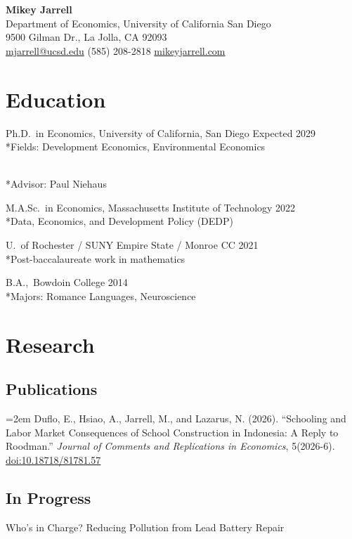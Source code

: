 \documentclass[12pt]{article}
\newcommand{\indentedline}[1]{%
    \\*\setlength{\parindent}{2em}\indent#1\setlength{\parindent}{0pt}%
    \vspace{0.5\baselineskip}%
}
\newcommand{\pub}[1]{\hangindent=2em\hangafter=1 #1\par\vspace{0.3\baselineskip}}
\begin{document}
\begin{center}
    {\LARGE \textbf{Mikey Jarrell}}\\[0.2cm]
    Department of Economics, University of California San Diego\\
    9500 Gilman Dr., La Jolla, CA 92093\\
    \href{mailto:mjarrell@ucsd.edu}{mjarrell@ucsd.edu} \hspace{1cm} (585) 208-2818 \hspace{1cm} \href{https://mikeyjarrell.com}{mikeyjarrell.com}
\end{center}

\section*{Education}
Ph.D.\ in Economics, University of California, San Diego \hfill Expected 2029
\indentedline{Fields: Development Economics, Environmental Economics}
\indentedline{Advisor: Paul Niehaus}

M.A.Sc.\ in Economics, Massachusetts Institute of Technology \hfill 2022
\indentedline{Data, Economics, and Development Policy (DEDP)}

U.\ of Rochester / SUNY Empire State / Monroe CC \hfill 2021
\indentedline{Post-baccalaureate work in mathematics}

B.A.,\ Bowdoin College \hfill 2014
\indentedline{Majors: Romance Languages, Neuroscience}

\section*{Research}

\subsection*{\small Publications}

\pub{Duflo, E., Hsiao, A., Jarrell, M., and Lazarus, N. (2026). ``Schooling and Labor Market Consequences of School Construction in Indonesia: A Reply to Roodman.'' \textit{Journal of Comments and Replications in Economics}, 5(2026-6). \href{https://doi.org/10.18718/81781.57}{doi:10.18718/81781.57}}

\subsection*{\small In Progress}

Who's in Charge? Reducing Pollution from Lead Battery Repair
\end{document}
